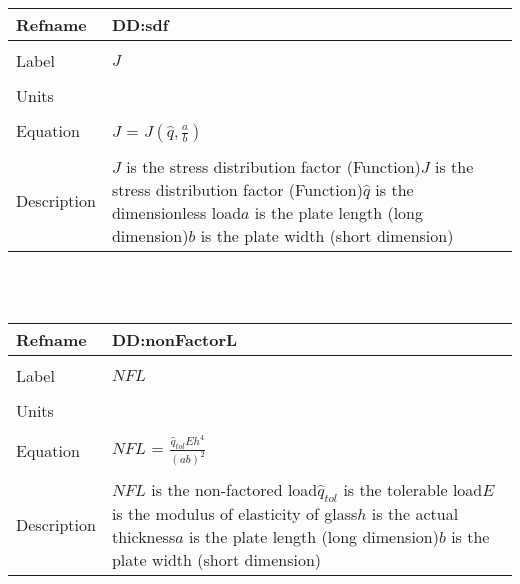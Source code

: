 \documentclass[12pt]{article}
\begin{document}
~\newline
\noindent \begin{minipage}{\textwidth}
\begin{tabular}{p{} p{}}
\toprule \textbf{Refname} & \textbf{DD:sdf}
\label{DD:sdf}
\\ \midrule \\
Label & $J$
\\ \midrule \\
Units & 
\\ \midrule \\
Equation & $J$ = $J(\hat{q},\frac{a}{b})$
\\ \midrule \\
Description & $J$ is the stress distribution factor (Function)\newline$J$ is the stress distribution factor (Function)\newline$\hat{q}$ is the dimensionless load\newline$a$ is the plate length (long dimension)\newline$b$ is the plate width (short dimension)
\\ \bottomrule \end{tabular}
\end{minipage}\\
~\newline
\noindent \begin{minipage}{\textwidth}
\begin{tabular}{p{} p{}}
\toprule \textbf{Refname} & \textbf{DD:nonFactorL}
\label{DD:nonFactorL}
\\ \midrule \\
Label & $NFL$
\\ \midrule \\
Units & 
\\ \midrule \\
Equation & $NFL$ = $\frac{\hat{q}_{tol}Eh^{4}}{(ab)^{2}}$
\\ \midrule \\
Description & $NFL$ is the non-factored load\newline$\hat{q}_{tol}$ is the tolerable load\newline$E$ is the modulus of elasticity of glass\newline$h$ is the actual thickness\newline$a$ is the plate length (long dimension)\newline$b$ is the plate width (short dimension)
\\ \bottomrule \end{tabular}
\end{minipage}\\
\end{document}
